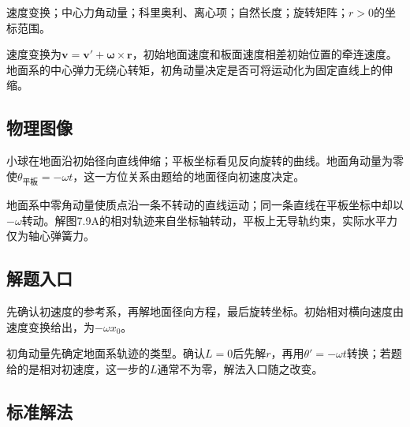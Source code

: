\documentclass[UTF8,fontset=fandol,a4paper,11pt]{ctexart}
\begin{document}
速度变换；中心力角动量；科里奥利、离心项；自然长度；旋转矩阵；$r>0$的坐标范围。

速度变换为$\boldsymbol v=\boldsymbol v'+\boldsymbol\omega\times\boldsymbol r$，初始地面速度和板面速度相差初始位置的牵连速度。地面系的中心弹力无绕心转矩，初角动量决定是否可将运动化为固定直线上的伸缩。




\subsection*{物理图像}

小球在地面沿初始径向直线伸缩；平板坐标看见反向旋转的曲线。地面角动量为零使\(\theta_{\text{平板}}=-\omega t\)，这一方位关系由题给的地面径向初速度决定。

地面系中零角动量使质点沿一条不转动的直线运动；同一条直线在平板坐标中却以$-\omega$转动。解图7.9A的相对轨迹来自坐标轴转动，平板上无导轨约束，实际水平力仅为轴心弹簧力。




\subsection*{解题入口}

先确认初速度的参考系，再解地面径向方程，最后旋转坐标。初始相对横向速度由速度变换给出，为\(-\omega x_0\)。

初角动量先确定地面系轨迹的类型。确认$L=0$后先解$r$，再用$\theta'=-\omega t$转换；若题给的是相对初速度，这一步的$L$通常不为零，解法入口随之改变。





\subsection*{标准解法}
\end{document}
